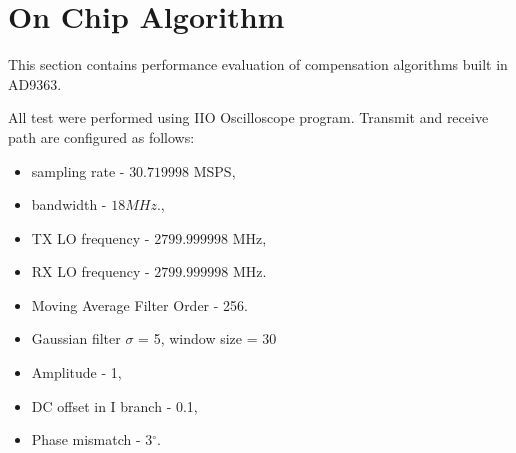 \documentclass[en,printmode]{mgr}
\begin{document}
   	\newpage
	\section{On Chip Algorithm}
		This section contains performance evaluation of compensation algorithms built in AD9363.
	
		All test were performed using IIO Oscilloscope program.
		Transmit and receive path are configured as follows:
		\begin{itemize}
			\item sampling rate - $30.719998$ MSPS,
			\item bandwidth - $18MHz$.,
			\item TX LO frequency - $2799.999998$ MHz,
			\item RX LO frequency - $2799.999998$ MHz.
		\end{itemize}

		\begin{itemize}
			\item Moving Average Filter Order - 256.
			\item Gaussian filter $\sigma$ = 5, window size = 30
			\item Amplitude - 1,
			\item DC offset in I branch - 0.1,
			\item Phase mismatch - 3$^\circ$.
		\end{itemize}
	    \newpage
\end{document}
